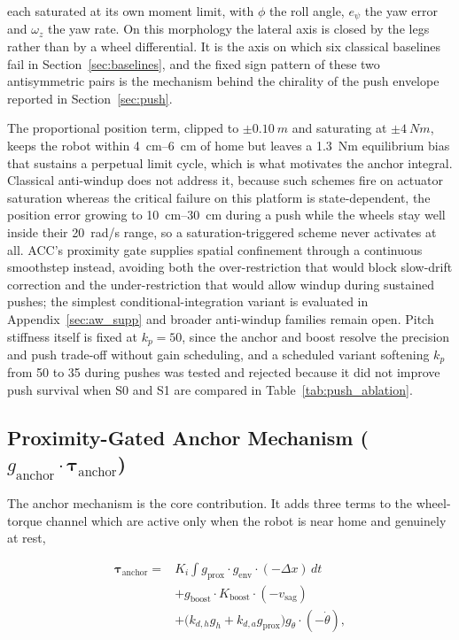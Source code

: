 \documentclass[a4paper,fleqn]{cas-dc}
\begin{document}
each saturated at its own moment limit, with $\phi$ the roll angle, $e_\psi$ the
yaw error and $\omega_z$ the yaw rate. On this morphology the lateral axis is
closed by the legs rather than by a wheel differential. It is the axis on which
six classical baselines fail in Section~\ref{sec:baselines}, and the fixed sign
pattern of these two antisymmetric pairs is the mechanism behind the chirality
of the push envelope reported in Section~\ref{sec:push}.

The proportional position term, clipped to $\pm\SI{0.10}{m}$ and saturating at
$\pm\SI{4}{Nm}$, keeps the robot within \SIrange{4}{6}{cm} of home but leaves a
\SI{1.3}{Nm} equilibrium bias that sustains a perpetual limit cycle, which is
what motivates the anchor integral. Classical anti-windup does not address it,
because such schemes fire on actuator saturation whereas the critical failure on
this platform is state-dependent, the position error growing to
\SIrange{10}{30}{cm} during a push while the wheels stay well inside their
\SI{20}{rad/s} range, so a saturation-triggered scheme never activates at all.
ACC's proximity gate supplies spatial confinement through a continuous smoothstep
instead, avoiding both the over-restriction that would block slow-drift
correction and the under-restriction that would allow windup during sustained
pushes; the simplest conditional-integration variant is evaluated in
Appendix~\ref{sec:aw_supp} and broader anti-windup families remain open. Pitch
stiffness itself is fixed at $k_p{=}50$, since the anchor and boost resolve the
precision and push trade-off without gain scheduling, and a scheduled variant
softening $k_p$ from \num{50} to \num{35} during pushes was tested and rejected
because it did not improve push survival when S0 and S1 are compared in
Table~\ref{tab:push_ablation}.

\subsection{Proximity-Gated Anchor Mechanism ($g_{\text{anchor}}\!\cdot\!\boldsymbol{\tau}_{\text{anchor}}$)}
\label{sec:anchor}

The anchor mechanism is the core contribution. It adds three terms to the
wheel-torque channel which are active only when the robot is near home and
genuinely at rest,

\begin{equation}
\begin{split}
\boldsymbol{\tau}_{\text{anchor}} = {}
& K_i\!\int\! g_{\text{prox}}\cdot g_{\text{env}}\cdot(-\Delta x)\,dt\\
& + g_{\text{boost}}\cdot K_{\text{boost}}\cdot(-v_{\text{sag}})\\
& + \bigl(k_{d,h}g_h + k_{d,a}g_{\text{prox}}\bigr)g_{\dot{\theta}}\cdot(-\dot{\theta}),
\end{split}
\label{eq:anchor}
\end{equation}
\end{document}

